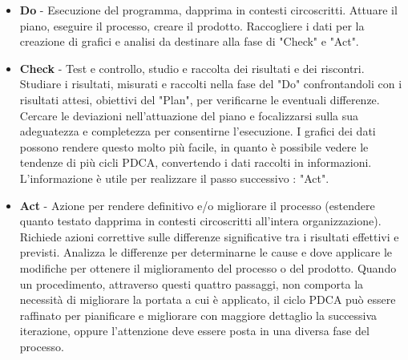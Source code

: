 {\begin{itemize}
  \item  \textbf{Do} -  Esecuzione del programma, dapprima in contesti
    circoscritti. Attuare il piano, eseguire il processo, creare il
    prodotto. Raccogliere i dati per la creazione di grafici e analisi
    da destinare alla fase di "Check" e "Act". 

  \item  \textbf{Check} - Test e controllo, studio e raccolta dei
    risultati e dei riscontri. Studiare i risultati, misurati e
    raccolti nella fase del "Do" confrontandoli con i risultati
    attesi, obiettivi del "Plan", per verificarne le eventuali
    differenze. Cercare le deviazioni nell'attuazione del piano e
    focalizzarsi sulla sua adeguatezza e completezza per consentirne
    l'esecuzione. I grafici dei dati possono rendere questo molto più
    facile, in quanto è possibile vedere le tendenze di più cicli
    PDCA, convertendo i dati raccolti in informazioni. L'informazione
    è utile per realizzare il passo successivo : "Act".

  \item  \textbf{Act} - Azione per rendere definitivo e/o migliorare
    il processo (estendere quanto testato dapprima in contesti
    circoscritti all'intera organizzazione). Richiede azioni
    correttive sulle differenze significative tra i risultati
    effettivi e previsti. Analizza le differenze per determinarne le
    cause e dove applicare le modifiche per ottenere il miglioramento
    del processo o del prodotto. Quando un procedimento, attraverso
    questi quattro passaggi, non comporta la necessità di migliorare
    la portata a cui è applicato, il ciclo PDCA può essere raffinato
    per pianificare e migliorare con maggiore dettaglio la successiva
    iterazione, oppure l'attenzione deve essere posta in una diversa
    fase del processo. 


\end{itemize}}
